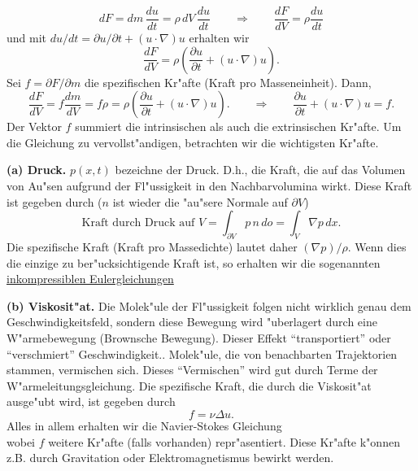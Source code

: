 $$ dF = dm \, \frac {du}{dt} = \rho\, dV\, \frac {du}{dt} \qquad \Rightarrow\qquad 
\frac{dF}{dV} = \rho  \frac {du}{dt}
$$
und mit $du/dt = \partial u/\partial t + (u\cdot \nabla) u$ erhalten wir
$$
\frac{dF}{dV} = \rho  \left(\frac{\partial u}{\partial t} + (u\cdot \nabla) u\right). 
$$
Sei $f = \partial F/\partial m$ die spezifischen Kr"afte (Kraft pro Masseneinheit). 
Dann, 
$$ \frac{dF}{dV} = f \frac{dm}{dV} = f \rho =  \rho 
  \left(\frac{\partial u}{\partial t} + (u\cdot \nabla) u\right). 
\qquad\Rightarrow\qquad
 \frac{\partial u}{\partial t} + (u\cdot \nabla) u = f.
 $$
Der Vektor $f$ summiert die intrinsischen als auch die extrinsischen Kr"afte.
Um die Gleichung zu vervollst"andigen, betrachten wir die wichtigsten Kr"afte.

{\bf (a)  Druck.}  
$p(x,t)$ bezeichne der Druck. D.h., die Kraft, die auf das Volumen 
von Au"sen aufgrund der Fl"ussigkeit in den Nachbarvolumina wirkt. 
Diese Kraft ist gegeben durch ($n$ ist wieder die "au"sere Normale auf $\partial V$)
$$ \mbox{Kraft durch Druck auf }V =  \int_{\partial V} p \, n\, do = \int_V \nabla p\, dx
.$$
Die spezifische Kraft (Kraft pro Massedichte) lautet daher 
 $(\nabla p)/\rho$. Wenn dies die einzige zu ber"ucksichtigende Kraft ist, so 
 erhalten wir die sogenannten \underline{inkompressiblen Eulergleichungen} 
\\
\par\medskip
{\bf (b) Viskosit"at.} 
Die Molek"ule der Fl"ussigkeit folgen nicht wirklich genau dem Geschwindigkeitsfeld, 
sondern diese Bewegung wird "uberlagert durch eine
W"armebewegung (Brownsche Bewegung). Dieser Effekt ``transportiert'' 
oder ``verschmiert'' Geschwindigkeit.. Molek"ule, die von benachbarten Trajektorien 
stammen, vermischen sich. Dieses ``Vermischen'' wird gut durch 
Terme der W"armeleitungsgleichung. Die spezifische Kraft, die durch die Viskosit"at 
ausge"ubt wird, ist gegeben durch
$$ f = \nu \Delta u.$$
Alles in allem erhalten wir die Navier-Stokes Gleichung \\
wobei $f$ weitere Kr"afte (falls vorhanden) repr"asentiert. Diese 
Kr"afte k"onnen z.B. durch Gravitation oder Elektromagnetismus 
bewirkt werden. 

